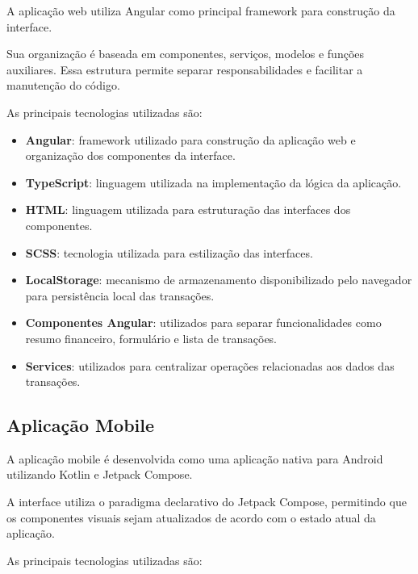 \documentclass[12pt,a4paper]{article}
\begin{document}
A aplicação web utiliza Angular como principal framework para construção da interface.

Sua organização é baseada em componentes, serviços, modelos e funções auxiliares. Essa estrutura permite separar responsabilidades e facilitar a manutenção do código.

As principais tecnologias utilizadas são:

\begin{itemize}
    \item \textbf{Angular}: framework utilizado para construção da aplicação web e organização dos componentes da interface.
    
    \item \textbf{TypeScript}: linguagem utilizada na implementação da lógica da aplicação.
    
    \item \textbf{HTML}: linguagem utilizada para estruturação das interfaces dos componentes.
    
    \item \textbf{SCSS}: tecnologia utilizada para estilização das interfaces.
    
    \item \textbf{LocalStorage}: mecanismo de armazenamento disponibilizado pelo navegador para persistência local das transações.
    
    \item \textbf{Componentes Angular}: utilizados para separar funcionalidades como resumo financeiro, formulário e lista de transações.
    
    \item \textbf{Services}: utilizados para centralizar operações relacionadas aos dados das transações.
\end{itemize}

\subsection{Aplicação Mobile}

A aplicação mobile é desenvolvida como uma aplicação nativa para Android utilizando Kotlin e Jetpack Compose.

A interface utiliza o paradigma declarativo do Jetpack Compose, permitindo que os componentes visuais sejam atualizados de acordo com o estado atual da aplicação.

As principais tecnologias utilizadas são:
\end{document}
